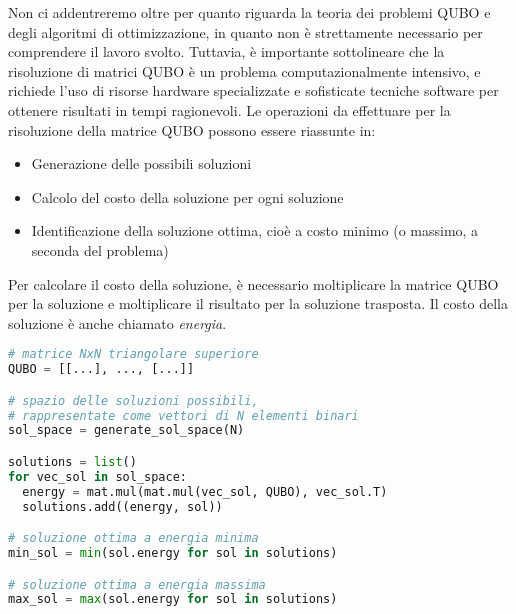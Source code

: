 Non ci addentreremo oltre per quanto riguarda la teoria dei problemi \gls{QUBO} e degli algoritmi di ottimizzazione, in quanto non è strettamente necessario per comprendere il lavoro svolto. Tuttavia, è importante sottolineare che la risoluzione di matrici \gls{QUBO} è un problema computazionalmente intensivo, e richiede l'uso di risorse hardware specializzate e sofisticate tecniche software per ottenere risultati in tempi ragionevoli. Le operazioni da effettuare per la risoluzione della matrice \gls{QUBO} possono essere riassunte in:

\begin{itemize}
    \item Generazione delle possibili soluzioni
    \item Calcolo del costo della soluzione per ogni soluzione
    \item Identificazione della soluzione ottima, cioè a costo minimo (o massimo, a seconda del problema)
\end{itemize}

Per calcolare il costo della soluzione, è necessario moltiplicare la matrice \gls{QUBO} per la soluzione e moltiplicare il risultato per la soluzione trasposta. Il costo della soluzione è anche chiamato \textit{energia}.

\vspace{5mm}
\begin{lstlisting}[language=Python, caption=Pseudocodice per la risoluzione di una matrice QUBO, label=lis:qubo_sol]
# matrice NxN triangolare superiore
QUBO = [[...], ..., [...]]

# spazio delle soluzioni possibili,
# rappresentate come vettori di N elementi binari
sol_space = generate_sol_space(N)

solutions = list()
for vec_sol in sol_space:
  energy = mat.mul(mat.mul(vec_sol, QUBO), vec_sol.T)
  solutions.add((energy, sol))

# soluzione ottima a energia minima
min_sol = min(sol.energy for sol in solutions)

# soluzione ottima a energia massima
max_sol = max(sol.energy for sol in solutions)
\end{lstlisting}
\vspace{5mm}

